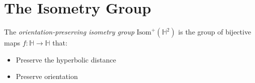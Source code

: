\section{The Isometry Group}

\begin{definition}
\label{def:isom_plus}
\leanok
The \emph{orientation-preserving isometry group} $\mathrm{Isom}^+(\mathbb{H}^2)$ is the group of bijective maps $f: \mathbb{H} \to \mathbb{H}$ that:
\begin{itemize}
\item Preserve the hyperbolic distance
\item Preserve orientation
\end{itemize}
\end{definition}
